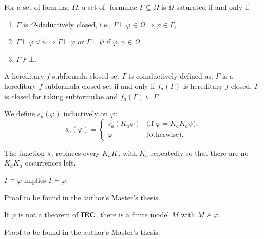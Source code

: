   \begin{definition}
   \label{saturated-set}
   For a set of formulae $\Omega$,
   a set of \iec-formulae $\Gamma\subseteq\Omega$ is $\Omega$-saturated%
    if and only if
   \begin{enumerate}
    \item $\Gamma$ is $\Omega$-deductively closed, i.e., $\Gamma\vdash\varphi\in
	  \Omega\Rightarrow
	  \varphi\in\Gamma$,
    \item $\Gamma\vdash\varphi\vee\psi \Rightarrow \Gamma\vdash\varphi$ or $\Gamma\vdash\psi$
	  if $\varphi,\psi\in\Omega$,
    \item $\Gamma\not\vdash\bot$.
   \end{enumerate}
  \end{definition}

  \begin{definition}
   A hereditary $f$-subformula-closed set $\Gamma$ is coinductively defined as:
   $\Gamma$ is a hereditary $f$-subformula-closed set if and only
   if $f_a(\Gamma)$ is hereditary $f$-closed, $\Gamma$ is closed for taking subformulae and
   $f_a(\Gamma)\subseteq \Gamma$.
  \end{definition}

  \begin{definition}
   We define $s_a(\varphi)$ inductively on $\varphi$:
   \[
   s_a(\varphi) = \begin{cases}
		   s_a(K_a\psi) & \text{(if $\varphi = K_aK_a\psi$)},\\
		   \varphi & \text{(otherwise)}.
		  \end{cases}
   \]
  \end{definition}
  \noindent The function $s_a$ replaces every $K_aK_a$ with $K_a$ repeatedly so that there are no
  $K_aK_a$ occurrences left.

  \newcommand{\natpls}{{\mathbb N}^{+}}

\begin{proposition}
 \label{strong-completeness}
 $\Gamma\models\varphi$ implies $\Gamma\vdash\varphi$.
\end{proposition}
Proof to be found in the author's Master's thesis.

\begin{proposition}
 \label{fmp}
 If $\varphi$ is not a theorem of ${\rm {\textbf{IEC}}}$,
 there is a finite model $M$ with $M\not\models\varphi$.
\end{proposition}
Proof to be found in the author's Master's thesis.

